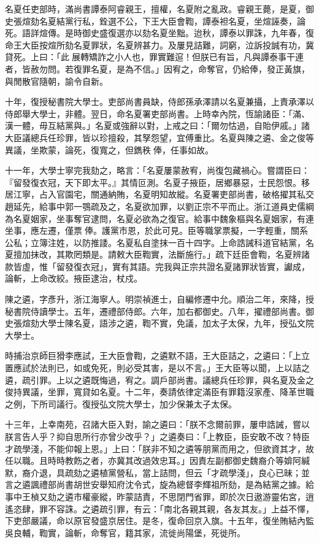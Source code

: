 \begin{pinyinscope}
名夏任吏部時，滿尚書譚泰阿睿親王，擅權，名夏附之亂政。睿親王薨，是夏，御史張煊劾名夏結黨行私，銓選不公，下王大臣會鞫，譚泰袒名夏，坐煊誣奏，論死。語詳煊傳。是時御史盛復選亦以劾名夏坐黜。迨秋，譚泰以罪誅，九年春，復命王大臣按煊所劾名夏罪狀，名夏辨甚力。及屢見詰難，詞窮，泣訴投誠有功，冀貸死。上曰：「此展轉矯詐之小人也，罪實難逭！但朕已有旨，凡與譚泰事干連者，皆赦勿問。若復罪名夏，是為不信。」因宥之，命奪官，仍給俸，發正黃旗，與閒散官隨朝，諭令自新。

十年，復授秘書院大學士。吏部尚書員缺，侍郎孫承澤請以名夏兼攝，上責承澤以侍郎舉大學士，非體。翌日，命名夏署吏部尚書。上時幸內院，恆諭諸臣：「滿、漢一體，毋互結黨與。」名夏或強辭以對，上戒之曰：「爾勿怙過，自貽伊戚。」諸大臣議總兵任珍罪，皆以珍擅殺，其孥怨望，宜傅重比。名夏與陳之遴、金之俊等異議，坐欺蒙，論死，復寬之，但鐫秩俸，任事如故。

十一年，大學士寧完我劾之，略言：「名夏屢蒙赦宥，尚復包藏禍心。嘗謂臣曰：『留發復衣冠，天下即太平。』其情叵測。名夏子掖臣，居鄉暴惡，士民怨恨。移居江寧，占入官園宅，關通納賄，名夏明知故縱。名夏署吏部尚書，破格擢其私交趙延先，給事中郭一鶚疏及之，名夏欲加罪，以劉正宗不平而止。浙江道員史儒綱為名夏姻家，坐事奪官逮問，名夏必欲為之復官。給事中魏象樞與名夏姻家，有連坐事，應左遷，僅票俸。護黨市恩，於此可見。臣等職掌票擬，一字輕重，關系公私；立簿注姓，以防推諉。名夏私自塗抹一百十四字。上命誥誡科道官結黨，名夏擅加抹改，其欺罔類是。請敕大臣鞫實，法斷施行。」疏下廷臣會鞫，名夏辨諸款皆虛，惟「留發復衣冠」，實有其語。完我與正宗共證名夏諸罪狀皆實，讞成，論斬，上命改絞。掖臣逮治，杖戍。

陳之遴，字彥升，浙江海寧人。明崇禎進士，自編修遷中允。順治二年，來降，授秘書院侍讀學士。五年，遷禮部侍郎。六年，加右都御史。八年，擢禮部尚書。御史張煊劾大學士陳名夏，語涉之遴，鞫不實，免議，加太子太保，九年，授弘文院大學士。

時捕治京師巨猾李應試，王大臣會鞫，之遴默不語，王大臣詰之，之遴曰：「上立置應試於法則已，如或免死，則必受其害，是以不言。」王大臣等以聞，上以詰之遴，疏引罪。上以之遴既悔過，宥之。調戶部尚書。議總兵任珍罪，與名夏及金之俊持異議，坐罪，寬貸如名夏。十二年，奏請依律定滿臣有罪籍沒家產、降革世職之例，下所司議行。復授弘文院大學士，加少保兼太子太保。

十三年，上幸南苑，召諸大臣入對，諭之遴曰：「朕不念爾前罪，屢申誥誡，嘗以朕言告人乎？抑自思所行亦曾少改乎？」之遴奏曰：「上教臣，臣安敢不改？特臣才疏學淺，不能仰報上恩。」上曰：「朕非不知之遴等朋黨而用之，但欲資其才，故任以職。且時時教飭之者，亦冀其改過效忠耳。」因責左副都御史魏裔介等媕阿緘默，裔介退，具疏劾之遴植黨營私，當上詰問，但云「才疏學淺」，良心已昧；並言之遴諷禮部尚書胡世安舉知府沈令式，旋為總督李輝祖所劾，是為結黨之據。給事中王楨又劾之遴市權豪縱，昨蒙詰責，不思閉門省罪，即於次日遨游靈佑宮，逍遙恣肆，罪不容誅。之遴疏引罪，有云：「南北各親其親，各友其友。」上益不懌，下吏部嚴議，命以原官發盛京居住。是冬，復命回京入旗。十五年，復坐賄結內監吳良輔，鞫實，論斬，命奪官，籍其家，流徙尚陽堡，死徙所。


\end{pinyinscope}
